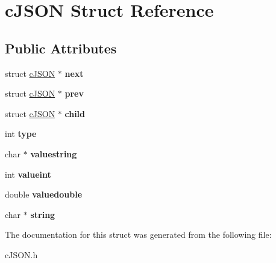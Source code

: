 \hypertarget{structc_j_s_o_n}{}\section{c\+J\+S\+ON Struct Reference}
\label{structc_j_s_o_n}
\subsection*{Public Attributes}
\begin{DoxyCompactItemize}
\item 
\mbox{\label{structc_j_s_o_n_ade862b880379b5e2a591f7326401fa8d}} 
struct \hyperlink{structc_j_s_o_n}{c\+J\+S\+ON} $\ast$ {\bfseries next}
\item 
\mbox{\label{structc_j_s_o_n_ad521633b2c32126f59d962c5673de362}} 
struct \hyperlink{structc_j_s_o_n}{c\+J\+S\+ON} $\ast$ {\bfseries prev}
\item 
\mbox{\label{structc_j_s_o_n_a401b274c2da358dac5c23ab8b2c71f85}} 
struct \hyperlink{structc_j_s_o_n}{c\+J\+S\+ON} $\ast$ {\bfseries child}
\item 
\mbox{\label{structc_j_s_o_n_ab13084c574681593b12f6e0a3db0dcfc}} 
int {\bfseries type}
\item 
\mbox{\label{structc_j_s_o_n_ad43f8de2571e504c4c5ce0a36990e6e1}} 
char $\ast$ {\bfseries valuestring}
\item 
\mbox{\label{structc_j_s_o_n_a369cea49494eb5d4409d532a731a0fbf}} 
int {\bfseries valueint}
\item 
\mbox{\label{structc_j_s_o_n_a4b21817d0fd2919901abadac73214e7f}} 
double {\bfseries valuedouble}
\item 
\mbox{\label{structc_j_s_o_n_aa6b47e9a4b0e0a26f519b1a2b6739983}} 
char $\ast$ {\bfseries string}
\end{DoxyCompactItemize}


The documentation for this struct was generated from the following file\+:\begin{DoxyCompactItemize}
\item 
c\+J\+S\+O\+N.\+h\end{DoxyCompactItemize}
